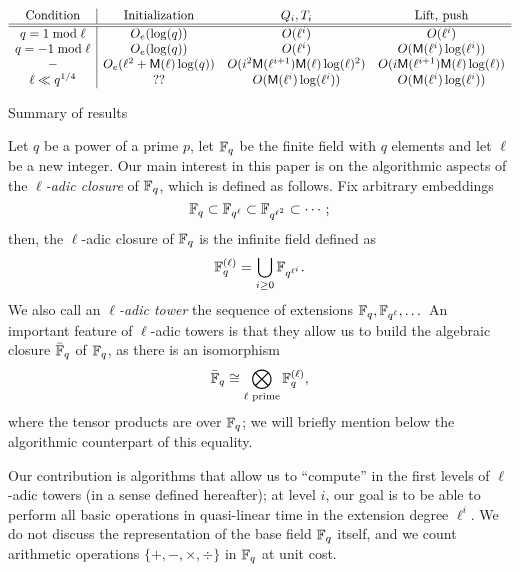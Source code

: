 \documentclass{sig-alternate}
\begin{document}
\begin{table*}[!t]
$$
\begin{array}{c|cccc}
  \text{Condition} & \text{Initialization} & Q_i, T_i & \text{Lift, push}\\
  \hline \hline
  q = 1 \bmod \ell & O_e(\log(q))  & O(\ell^i) & O(\ell^i) \\
  q = -1 \bmod \ell & O_e(\log(q)) & O(\ell^i) & O(\mathsf{M}(\ell^i) \log(\ell^i)) \\
  - & O_e (\ell^2+\mathsf{M}(\ell) \log(q)) & O(i^2\mathsf{M}(\ell^{i+1})\mathsf{M}(\ell)\log(\ell)^2) & O(i \mathsf{M}(\ell^{i+1})\mathsf{M}(\ell)\log(\ell))\\
  \ell \ll q^{1/4} & ?? & O(\mathsf{M}(\ell^i) \log(\ell^i)) & O(\mathsf{M}(\ell^i) \log(\ell^i)) 
\end{array}
$$
\label{table:main}
\caption{Summary of results}
\end{table*}

Let $q$ be a power of a prime $p$, let $\mathbb{F}_q$ be the finite field with
$q$ elements and let $\ell$ be a new integer. Our main interest in
this paper is on the algorithmic aspects of the \emph{$\ell$-adic
  closure} of $\mathbb{F}_q$, which is defined as follows. Fix arbitrary
embeddings
\begin{equation*}
  \mathbb{F}_q \subset \mathbb{F}_{q^\ell} \subset \mathbb{F}_{q^{\ell^2}} \subset \cdots;
\end{equation*}
then, the $\ell$-adic closure of $\mathbb{F}_q$ is the infinite field defined as
\begin{equation*}
  \mathbb{F}_q^{(\ell)} = \bigcup_{i\ge 0}\mathbb{F}_{q^{\ell^i}}.
\end{equation*}
We also call an \emph{$\ell$-adic tower} the sequence of extensions
$\mathbb{F}_q,\mathbb{F}_{q^\ell},\dots$ An important feature of $\ell$-adic towers is
that they allow us to build the algebraic closure $\bar{\mathbb{F}}_q$ of
$\mathbb{F}_q$, as there is an isomorphism
\begin{equation}
  \label{eq:tensor}
  \bar{\mathbb{F}}_q \cong \bigotimes_{\ell\text{ prime}} \mathbb{F}_q^{(\ell)},
\end{equation}
where the tensor products are over $\mathbb{F}_q$; we will briefly mention
below the algorithmic counterpart of this equality.

Our contribution is algorithms that allow us to ``compute'' in the
first levels of $\ell$-adic towers (in a sense defined hereafter); at
level $i$, our goal is to be able to perform all basic operations in
quasi-linear time in the extension degree $\ell^i$.  We do not discuss
the representation of the base field $\mathbb{F}_q$ itself, and we count
arithmetic operations $\{+,-,\times,\div\}$ in $\mathbb{F}_q$ at unit cost.
\end{document}
